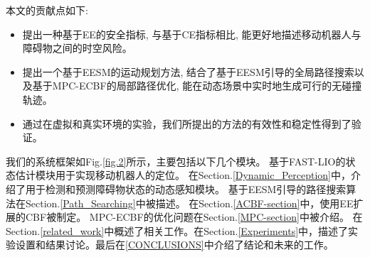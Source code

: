 \documentclass[preprint,5p,times,twocolumn]{elsarticle}
\begin{document}
本文的贡献点如下:
\begin{itemize}
\item 提出一种基于EE的安全指标, 与基于CE指标相比, 能更好地描述移动机器人与障碍物之间的时空风险。
\item 提出一个基于EESM的运动规划方法, 结合了基于EESM引导的全局路径搜索以及基于MPC-ECBF的局部路径优化, 能在动态场景中实时地生成可行的无碰撞轨迹。
\item 通过在虚拟和真实环境的实验，我们所提出的方法的有效性和稳定性得到了验证。
\end{itemize}



我们的系统框架如Fig.\ref{fig.2}所示，主要包括以下几个模块。
基于FAST-LIO\citep{Xu2020FASTLIOAF}的状态估计模块用于实现移动机器人的定位。
在Section.\ref{Dynamic_Perception}中，介绍了用于检测和预测障碍物状态的动态感知模块。
基于EESM引导的路径搜索算法在Section.\ref{Path_Searching}中被描述。
在Section.\ref{ACBF-section}中，使用EE扩展的CBF被制定。
MPC-ECBF的优化问题在Section.\ref{MPC-section}中被介绍。
在Section.\ref{related_work}中概述了相关工作。在Section.\ref{Experiments}中，描述了实验设置和结果讨论。最后在\ref{CONCLUSIONS}中介绍了结论和未来的工作。
\end{document}
